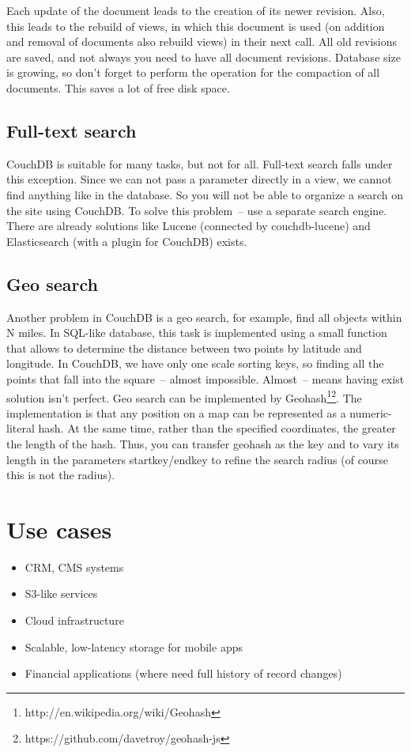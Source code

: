 Each update of the document leads to the creation of its newer revision. Also, this leads to the rebuild of views, in which this document is used (on addition and removal of documents also rebuild views) in their next call. All old revisions are saved, and not always you need to have all document revisions. Database size is growing, so don't forget to perform the operation for the compaction of all documents. This saves a lot of free disk space.

\subsection{Full-text search}

CouchDB is suitable for many tasks, but not for all. Full-text search falls under this exception. Since we can not pass a parameter directly in a view, we cannot find anything like in the database. So you will not be able to organize a search on the site using CouchDB. To solve this problem~-- use a separate search engine. There are already solutions like Lucene (connected by couchdb-lucene) and Elasticsearch (with a plugin for CouchDB) exists.

\subsection{Geo search}

Another problem in CouchDB is a geo search, for example, find all objects within N miles. In SQL-like database, this task is implemented using a small function that allows to determine the distance between two points by latitude and longitude. In CouchDB, we have only one scale sorting keys, so finding all the points that fall into the square~-- almost impossible. Almost~-- means having exist solution isn’t perfect. Geo search can be implemented by Geohash\footnote{http://en.wikipedia.org/wiki/Geohash}\footnote{https://github.com/davetroy/geohash-js}. The implementation is that any position on a map can be represented as a numeric-literal hash. At the same time, rather than the specified coordinates, the greater the length of the hash. Thus, you can transfer geohash as the key and to vary its length in the parameters startkey/endkey to refine the search radius (of course this is not the radius).


\section{Use cases}

\begin{itemize}
  \item CRM, CMS systems
  \item S3-like services
  \item Cloud infrastructure
  \item Scalable, low-latency storage for mobile apps
  \item Financial applications (where need full history of record changes)
\end{itemize}